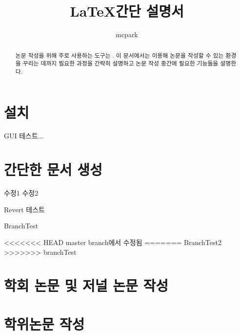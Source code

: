 \documentclass[a4paper, nobookmarks, subfigure, adjustmath, amsmath]{oblivoir}
\title{\LaTeX 간단 설명서}
\author{mcpark}
\begin{document}
\maketitle
\begin{abstract}
논문 작성을 위해 주로 사용하는 도구는 .
이 문서에서는  이용해 논문을 작성할 수 있는 환경을 꾸리는 데까지 필요한 과정을 간략히 설명하고 논문 작성 중간에 필요한  기능들을 설명한다.
\end{abstract}

\section{설치}
GUI 테스트...


\section{간단한 문서 생성}
수정1
수정2

Revert 테스트

BranchTest

<<<<<<< HEAD
master branch에서 수정됨
=======
BranchTest2
>>>>>>> branchTest
\section{학회 논문 및 저널 논문 작성}


\section{학위논문 작성}
\end{document}
